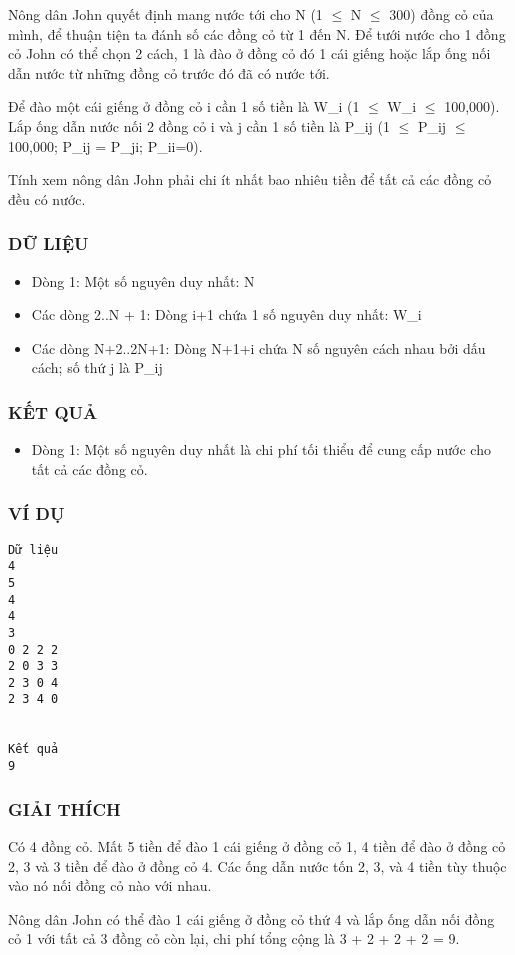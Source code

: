 



   Nông dân John quyết định mang nước tới cho N (1  $\le$  N  $\le$  300) đồng cỏ của mình, để thuận tiện ta đánh số các đồng cỏ từ 1 đến N. Để tưới nước cho 1 đồng cỏ John có thể chọn 2 cách, 1 là đào ở đồng cỏ  đó 1 cái giếng hoặc lắp ống nối dẫn nước từ những đồng cỏ trước đó đã có nước tới.  

   Để đào một cái giếng ở đồng cỏ i cần 1 số tiền là W\_i (1  $\le$  W\_i  $\le$  100,000). Lắp ống dẫn nước nối 2 đồng cỏ i và j cần 1 số tiền là P\_ij (1  $\le$  P\_ij  $\le$  100,000; P\_ij = P\_ji; P\_ii=0).  

   Tính xem nông dân John phải chi ít nhất bao nhiêu tiền để tất cả các  đồng cỏ đều có nước.  

\subsubsection{   DỮ LIỆU  }
\begin{itemize}
	\item     Dòng 1: Một số nguyên duy nhất: N   
	\item     Các dòng 2..N + 1: Dòng i+1 chứa 1 số nguyên duy nhất: W\_i   
	\item     Các dòng N+2..2N+1: Dòng N+1+i chứa N số nguyên cách nhau bởi dấu cách; số thứ         j là P\_ij   
\end{itemize}

\subsubsection{   KẾT QUẢ  }
\begin{itemize}
	\item     Dòng 1: Một số nguyên duy nhất là chi phí tối thiểu         để cung cấp nước cho tất cả các đồng cỏ.   
\end{itemize}

\subsubsection{   VÍ DỤ  }
\begin{verbatim}
Dữ liệu
4
5
4
4
3
0 2 2 2
2 0 3 3
2 3 0 4
2 3 4 0


Kết quả
9
\end{verbatim}

\subsubsection{   GIẢI THÍCH  }

   Có 4 đồng cỏ. Mất 5 tiền để đào 1 cái giếng ở đồng cỏ 1, 4 tiền để đào ở đồng cỏ 2, 3 và 3 tiền để đào ở đồng cỏ 4. Các ống dẫn nước tốn 2, 3, và 4 tiền tùy thuộc vào nó nối đồng cỏ nào với nhau.  

   Nông dân John có thể đào 1 cái giếng ở đồng cỏ thứ 4 và lắp ống dẫn  nối đồng cỏ 1 với tất cả 3 đồng cỏ còn lại, chi phí tổng cộng là 3 + 2 + 2 + 2 = 9.  

